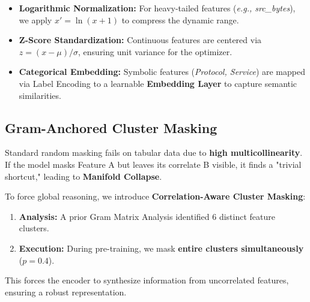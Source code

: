 \documentclass[
  10pt,
  twocolumn,
  a4paper,
  parskip=half
]{scrartcl}
\begin{document}
\begin{itemize}[noitemsep, topsep=0pt]
    \item \textbf{Logarithmic Normalization:} For heavy-tailed features (\textit{e.g., src\_bytes}), we apply $x' = \ln(x + 1)$ to compress the dynamic range.
    \item \textbf{Z-Score Standardization:} Continuous features are centered via $z = (x - \mu)/\sigma$, ensuring unit variance for the optimizer.
    \item \textbf{Categorical Embedding:} Symbolic features (\textit{Protocol, Service}) are mapped via Label Encoding to a learnable \textbf{Embedding Layer} to capture semantic similarities.
\end{itemize}

\subsection{Gram-Anchored Cluster Masking}
Standard random masking fails on tabular data due to \textbf{high multicollinearity}. If the model masks Feature A but leaves its correlate B visible, it finds a "trivial shortcut," leading to \textbf{Manifold Collapse}.

To force global reasoning, we introduce \textbf{Correlation-Aware Cluster Masking}:
\begin{enumerate}[noitemsep]
    \item \textbf{Analysis:} A prior Gram Matrix Analysis identified 6 distinct feature clusters.
    \item \textbf{Execution:} During pre-training, we mask \textbf{entire clusters simultaneously} ($p=0.4$).
\end{enumerate}
This forces the encoder to synthesize information from uncorrelated features, ensuring a robust representation.
\end{document}
